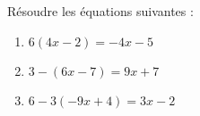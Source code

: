 \documentclass[a4paper,11pt,exos]{nsi} %
\begin{document}
\maketitle

\begin{exercice}
    Résoudre les équations suivantes :
    \begin{multicols}{3}
        \begin{enumerate}
            \item $6(4x-2)=-4x-5$
			\item $3-(6x-7)=9x+7$
			\item $6-3(-9x+4)=3x-2$
        \end{enumerate}
    \end{multicols}
    
\end{exercice}
\end{document}
